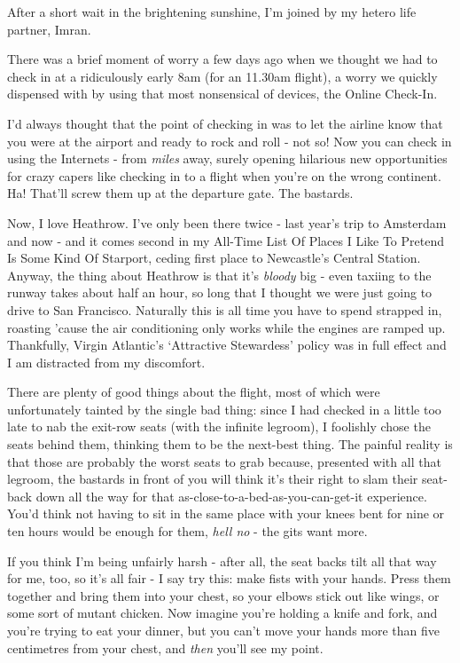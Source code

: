 \documentclass[a5paper,titlepage,11pt]{book}
\begin{document}
After a short wait in the brightening sunshine, I'm joined by my hetero life partner, Imran.

There was a brief moment of worry a few days ago when we thought we had to check in at a ridiculously early 8am (for an 11.30am flight), a worry we quickly dispensed with by using that most nonsensical of devices, the Online Check-In.

I'd always thought that the point of checking in was to let the airline know that you were at the airport and ready to rock and roll - not so!  Now you can check in using the Internets - from \emph{miles} away, surely opening hilarious new opportunities for crazy capers like checking in to a flight when you're on the wrong continent.  Ha!  That'll screw them up at the departure gate.  The bastards.

Now, I love Heathrow.  I've only been there twice - last year's trip to Amsterdam and now - and it comes second in my All-Time List Of Places I Like To Pretend Is Some Kind Of Starport, ceding first place to Newcastle's Central Station.  Anyway, the thing about Heathrow is that it's \emph{bloody} big - even taxiing to the runway takes about half an hour, so long that I thought we were just going to drive to San Francisco.  Naturally this is all time you have to spend strapped in, roasting 'cause the air conditioning only works while the engines are ramped up.  Thankfully, Virgin Atlantic's `Attractive Stewardess' policy was in full effect and I am distracted from my discomfort.

There are plenty of good things about the flight, most of which were unfortunately tainted by the single bad thing: since I had checked in a little too late to nab the exit-row seats (with the infinite legroom), I foolishly chose the seats behind them, thinking them to be the next-best thing.   The painful reality is that those are probably the worst seats to grab because, presented with all that legroom, the bastards in front of you will think it's their right to slam their seat-back down all the way for that as-close-to-a-bed-as-you-can-get-it experience.  You'd think not having to sit in the same place with your knees bent for nine or ten hours would be enough for them, \emph{hell no} - the gits want more.

If you think I'm being unfairly harsh - after all, the seat backs tilt all that way for me, too, so it's all fair - I say try this:  make fists with your hands.  Press them together and bring them into your chest, so your elbows stick out like wings, or some sort of mutant chicken.  Now imagine you're holding a knife and fork, and you're trying to eat your dinner, but you can't move your hands more than five centimetres from your chest, and \emph{then} you'll see my point.
\end{document}
